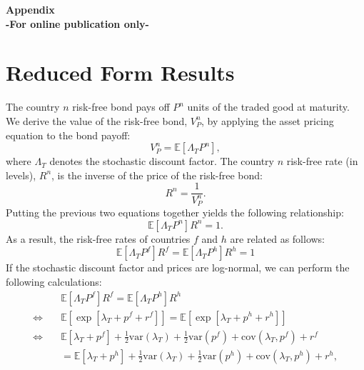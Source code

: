 \appendix

\begin{center}
  {\Huge\bf Appendix}\\
  {\large\bf -For online publication only-}
\end{center}

\section{Reduced Form Results \label{Appendix_ReducedFormResults}}

The country $n$ risk-free bond pays off $P^n$ units of the traded good
at maturity. We derive the value of the risk-free bond, $V^n_P$, by
applying the asset pricing equation to the bond payoff:
\begin{equation*}
  V^n_P = \mathbb{E}\left[\Lambda_{T} P^n
  \right],
\end{equation*}
where $\Lambda_{T}$ denotes the stochastic discount factor. The
country $n$ risk-free rate (in levels), $R^n$, is the inverse of the
price of the risk-free bond:
\begin{equation*}
  R^n = \frac{1}{V^n_P}.
\end{equation*}
Putting the previous two equations together yields the following
relationship:
\begin{equation*}
  \mathbb{E}\left[ \Lambda_{T} P^n \right] R^n = 1.
\end{equation*}
As a result, the risk-free rates of countries $f$ and $h$ are related
as follows:
\begin{equation*}
  \mathbb{E}\left[\Lambda_{T} P^f \right] R^f
  = \mathbb{E}\left[\Lambda_{T} P^h \right] R^h = 1
\end{equation*} 
If the stochastic discount factor and prices are log-normal, we can
perform the following calculations:
\begin{align*}
  & \mathbb{E}\left[\Lambda_{T} P^f \right] R^f
    = \mathbb{E}\left[\Lambda_{T} P^h \right] R^h \\
  \Leftrightarrow\quad
  & \mathbb{E}\left[\exp\left[ \lambda_{T} + p^f + r^f \right]\right]
    = \mathbb{E}\left[\exp\left[\lambda_{T} + p^h + r^h \right]\right] \\
  \Leftrightarrow\quad
  & \mathbb{E}\left[\lambda_{T} + p^f\right] + \frac{1}{2}\text{var}\left(\lambda_{T}\right) + 
    \frac{1}{2}\text{var}\left(p^f\right) + \text{cov}\left(\lambda_{T}, p^f\right) + r^f \\
  & = 
    \mathbb{E}\left[\lambda_{T}+ p^h\right] + \frac{1}{2}\text{var}\left(\lambda_{T}\right)+ 
    \frac{1}{2}\text{var}\left(p^h\right) + \text{cov}\left(\lambda_{T}, p^h\right)+r^h,
\end{align*}
